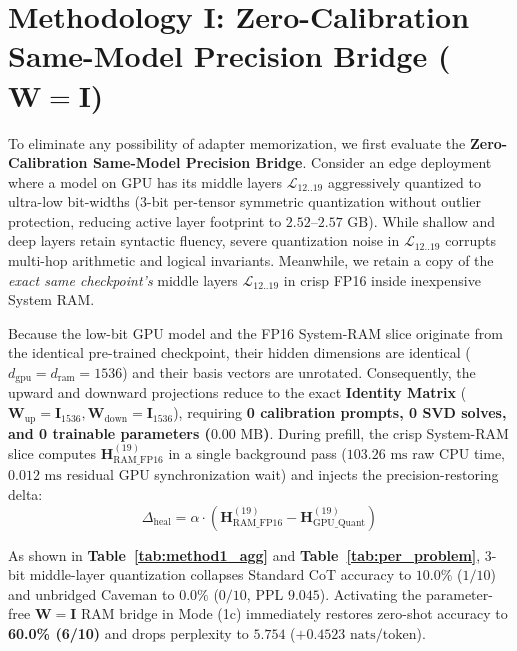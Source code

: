 \documentclass[10pt,twocolumn]{article}
\begin{document}
\section{Methodology I: Zero-Calibration Same-Model Precision Bridge ($\mathbf{W} = \mathbf{I}$)}
\label{sec:method1}
To eliminate any possibility of adapter memorization, we first evaluate the \textbf{Zero-Calibration Same-Model Precision Bridge}. Consider an edge deployment where a model on GPU has its middle layers $\mathcal{L}_{12..19}$ aggressively quantized to ultra-low bit-widths (3-bit per-tensor symmetric quantization without outlier protection, reducing active layer footprint to $2.52\text{--}2.57\text{ GB}$). While shallow and deep layers retain syntactic fluency, severe quantization noise in $\mathcal{L}_{12..19}$ corrupts multi-hop arithmetic and logical invariants. Meanwhile, we retain a copy of the \emph{exact same checkpoint's} middle layers $\mathcal{L}_{12..19}$ in crisp FP16 inside inexpensive System RAM.

Because the low-bit GPU model and the FP16 System-RAM slice originate from the identical pre-trained checkpoint, their hidden dimensions are identical ($d_{\text{gpu}} = d_{\text{ram}} = 1536$) and their basis vectors are unrotated. Consequently, the upward and downward projections reduce to the exact \textbf{Identity Matrix} ($\mathbf{W}_{\text{up}} = \mathbf{I}_{1536}, \mathbf{W}_{\text{down}} = \mathbf{I}_{1536}$), requiring \textbf{0 calibration prompts, 0 SVD solves, and 0 trainable parameters ($0.00\text{ MB}$)}. During prefill, the crisp System-RAM slice computes $\mathbf{H}_{\text{RAM\_FP16}}^{(19)}$ in a single background pass ($103.26\text{ ms}$ raw CPU time, $0.012\text{ ms}$ residual GPU synchronization wait) and injects the precision-restoring delta:
\begin{equation}
    \Delta_{\text{heal}} = \alpha \cdot \left(\mathbf{H}_{\text{RAM\_FP16}}^{(19)} - \mathbf{H}_{\text{GPU\_Quant}}^{(19)}\right)
\end{equation}

As shown in \textbf{Table~\ref{tab:method1_agg}} and \textbf{Table~\ref{tab:per_problem}}, 3-bit middle-layer quantization collapses Standard CoT accuracy to $10.0\%$ ($1/10$) and unbridged Caveman to $0.0\%$ ($0/10$, PPL $9.045$). Activating the parameter-free $\mathbf{W}=\mathbf{I}$ RAM bridge in Mode (1c) immediately restores zero-shot accuracy to \textbf{60.0\% (6/10)} and drops perplexity to $\mathbf{5.754}$ ($+0.4523\text{ nats/token}$).
\end{document}
